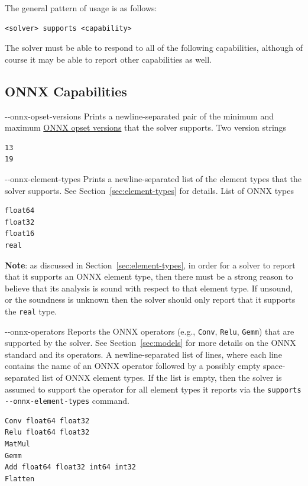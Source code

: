 The general pattern of usage is as follows:
\begin{lstlisting}[style=bash]
<solver> supports <capability>
\end{lstlisting}
The solver must be able to respond to all of the following capabilities, although of course it may be able to report other capabilities as well.

\subsection{ONNX Capabilities}
\label{sec:onnx-capabilities}

\clOutputOption
{-{}-onnx-opset-versions}
{Prints a newline-separated pair of the minimum and maximum \href{https://onnxruntime.ai/docs/reference/compatibility.html\#onnx-opset-support}{ONNX opset versions} that the solver supports.}
{Two version strings}
\begin{lstlisting}[style=bash]
%*\exampleSolver* supports --onnx-opset-versions
13
19
\end{lstlisting}

\clOutputOption
{-{}-onnx-element-types}
{Prints a newline-separated list of the element types that the solver supports. See Section~\ref{sec:element-types} for details.}
{List of ONNX types}
\begin{lstlisting}[style=bash]
%*\exampleSolver* supports --onnx-element-types
float64
float32
float16
real
\end{lstlisting}
\textbf{Note}: as discussed in Section~\ref{sec:element-types}, in order for a solver to report that it supports an ONNX element type, then there must be a strong reason to believe that its analysis is sound with respect to that element type. If unsound, or the soundness is unknown then the solver should only report that it supports the \texttt{real} type.

\clOutputOption
{-{}-onnx-operators}
{Reports the ONNX operators (e.g., \texttt{Conv}, \texttt{Relu}, \texttt{Gemm}) that are supported by the solver. See Section~\ref{sec:models} for more details on the ONNX standard and its operators.
}
{A newline-separated list of lines, where each line contains the name of an ONNX operator followed by a possibly empty space-separated list of ONNX element types.  If the list is empty, then the solver is assumed to support the operator for all element types it reports via the \texttt{supports -{}-onnx-element-types} command.
}
\begin{lstlisting}[style=bash]
%*\exampleSolver* supports --onnx-operators
Conv float64 float32
Relu float64 float32
MatMul
Gemm
Add float64 float32 int64 int32
Flatten
\end{lstlisting}

